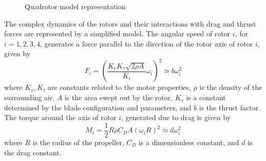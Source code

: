 \begin{figure}[h!]
	\centering
	\caption{Quadrotor model representation\label{fig:mod.model}}
\end{figure}	



%

The complex dynamics of the rotors and their interactions with drag and thrust forces are represented by a simplified model. 
The angular speed  of rotor $ i $, for $ i=1,2,3,4 $, generates a force  parallel to the direction of the rotor axis of rotor $ i $, given by
\begin{equation}\label{key}
F_i=\left( \frac{K_vK_\tau\sqrt{2\rho A}}{K_t}\omega_i\right)^2\simeq b\omega_i^2 
\end{equation}
where $ K_v,K_t $ are constants related to the motor properties, $ \rho $ is the density of the surrounding air, $ A $ is the area swept out by the rotor, $ K_\tau $ is a constant determined by the blade configuration and parameters, and $ b $ is the thrust factor.\\
The torque around the axis of rotor $ i $, generated due to drag is given by
\begin{equation}\label{key}
M_{i}=\frac{1}{2}R\rho C_DA(\omega_iR)^2\simeq d\omega_i^2
\end{equation}
where $ R $ is the radius of the propeller, $ C_D $ is a dimensionless constant, and $ d $ is the drag constant.


